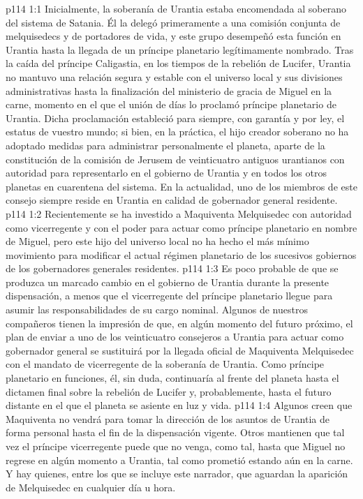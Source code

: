 \vs p114 1:1 Inicialmente, la soberanía de Urantia estaba encomendada al soberano del sistema de Satania. Él la delegó primeramente a una comisión conjunta de melquisedecs y de portadores de vida, y este grupo desempeñó esta función en Urantia hasta la llegada de un príncipe planetario legítimamente nombrado. Tras la caída del príncipe Caligastia, en los tiempos de la rebelión de Lucifer, Urantia no mantuvo una relación segura y estable con el universo local y sus divisiones administrativas hasta la finalización del ministerio de gracia de Miguel en la carne, momento en el que el unión de días lo proclamó príncipe planetario de Urantia. Dicha proclamación estableció para siempre, con garantía y por ley, el estatus de vuestro mundo; si bien, en la práctica, el hijo creador soberano no ha adoptado medidas para administrar personalmente el planeta, aparte de la constitución de la comisión de Jerusem de veinticuatro antiguos urantianos con autoridad para representarlo en el gobierno de Urantia y en todos los otros planetas en cuarentena del sistema. En la actualidad, uno de los miembros de este consejo siempre reside en Urantia en calidad de gobernador general residente.
\vs p114 1:2 Recientemente se ha investido a Maquiventa Melquisedec con autoridad como vicerregente y con el poder para actuar como príncipe planetario en nombre de Miguel, pero este hijo del universo local no ha hecho el más mínimo movimiento para modificar el actual régimen planetario de los sucesivos gobiernos de los gobernadores generales residentes.
\vs p114 1:3 Es poco probable de que se produzca un marcado cambio en el gobierno de Urantia durante la presente dispensación, a menos que el vicerregente del príncipe planetario llegue para asumir las responsabilidades de su cargo nominal. Algunos de nuestros compañeros tienen la impresión de que, en algún momento del futuro próximo, el plan de enviar a uno de los veinticuatro consejeros a Urantia para actuar como gobernador general se sustituirá por la llegada oficial de Maquiventa Melquisedec con el mandato de vicerregente de la soberanía de Urantia. Como príncipe planetario en funciones, él, sin duda, continuaría al frente del planeta hasta el dictamen final sobre la rebelión de Lucifer y, probablemente, hasta el futuro distante en el que el planeta se asiente en luz y vida.
\vs p114 1:4 Algunos creen que Maquiventa no vendrá para tomar la dirección de los asuntos de Urantia de forma personal hasta el fin de la dispensación vigente. Otros mantienen que tal vez el príncipe vicerregente puede que no venga, como tal, hasta que Miguel no regrese en algún momento a Urantia, tal como prometió estando aún en la carne. Y hay quienes, entre los que se incluye este narrador, que aguardan la aparición de Melquisedec en cualquier día u hora.
